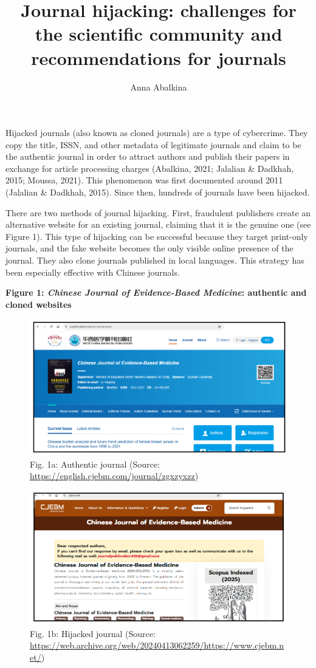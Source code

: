 \documentclass[a4paper,
fontsize=11pt,
oneside,
numbers=noperiodatend,
parskip=half-,
bibliography=totoc,
final
]{scrartcl}
\title{\LARGE{Journal hijacking: challenges for the scientific community and recommendations for journals}}%
\author{Anna Abalkina} %
\date{}
\begin{document}
\maketitle
\thispagestyle{fancyplain} 


Hijacked journals (also known as cloned journals) are a type of
cybercrime. They copy the title, ISSN, and other metadata of legitimate
journals and claim to be the authentic journal in order to attract
authors and publish their papers in exchange for article processing
charges (Abalkina, 2021; Jalalian \& Dadkhah, 2015; Moussa, 2021). This
phenomenon was first documented around 2011 (Jalalian \& Dadkhah, 2015).
Since then, hundreds of journals have been hijacked.

There are two methods of journal hijacking. First, fraudulent publishers
create an alternative website for an existing journal, claiming that it
is the genuine one (see Figure 1). This type of hijacking can be
successful because they target print-only journals, and the fake website
becomes the only visible online presence of the journal. They also clone
journals published in local languages. This strategy has been especially
effective with Chinese journals.

\pagebreak

\textbf{Figure 1: \emph{Chinese Journal of Evidence-Based Medicine}:
authentic and cloned websites}

\begin{figure}[H]
\centering
\includegraphics[width=.7\textwidth]{img/fig1a.png}
\caption{Fig. 1a: Authentic journal (Source: \url{https://english.cjebm.com/journal/zgxzyxzz})}
\end{figure}

\begin{figure}[H]
\centering
\includegraphics[width=.7\textwidth]{img/fig1b.png}
\caption{Fig. 1b: Hijacked journal (Source: \url{https://web.archive.org/web/20240413062259/https://www.cjebm.net/})}
\end{figure}
\end{document}

